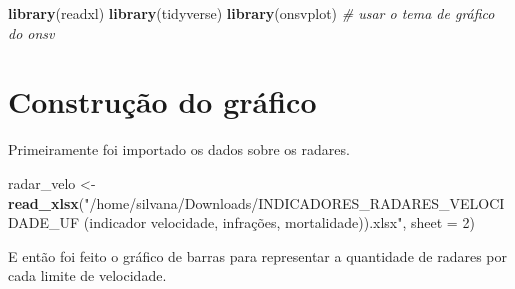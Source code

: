 \documentclass[
]{book}
\newenvironment{Shaded}{\begin{snugshade}}{\end{snugshade}}
\newcommand{\AttributeTok}[1]{\textcolor[rgb]{0.13,0.29,0.53}{#1}}
\newcommand{\CommentTok}[1]{\textcolor[rgb]{0.56,0.35,0.01}{\textit{#1}}}
\newcommand{\DecValTok}[1]{\textcolor[rgb]{0.00,0.00,0.81}{#1}}
\newcommand{\FunctionTok}[1]{\textcolor[rgb]{0.13,0.29,0.53}{\textbf{#1}}}
\newcommand{\NormalTok}[1]{#1}
\newcommand{\OtherTok}[1]{\textcolor[rgb]{0.56,0.35,0.01}{#1}}
\newcommand{\StringTok}[1]{\textcolor[rgb]{0.31,0.60,0.02}{#1}}
\begin{document}
\begin{Shaded}
\begin{Highlighting}[]
\FunctionTok{library}\NormalTok{(}\StringTok{\textquotesingle{}readxl\textquotesingle{}}\NormalTok{) }
\FunctionTok{library}\NormalTok{(}\StringTok{\textquotesingle{}tidyverse\textquotesingle{}}\NormalTok{)}
\FunctionTok{library}\NormalTok{(}\StringTok{\textquotesingle{}onsvplot\textquotesingle{}}\NormalTok{) }\CommentTok{\# usar o tema de gráfico do onsv}
\end{Highlighting}
\end{Shaded}

\section{Construção do gráfico}\label{construuxe7uxe3o-do-gruxe1fico}

Primeiramente foi importado os dados sobre os radares.

\begin{Shaded}
\begin{Highlighting}[]
\NormalTok{radar\_velo }\OtherTok{\textless{}{-}} \FunctionTok{read\_xlsx}\NormalTok{(}\StringTok{"/home/silvana/Downloads/INDICADORES\_RADARES\_VELOCIDADE\_UF (indicador velocidade, infrações, mortalidade)).xlsx"}\NormalTok{, }\AttributeTok{sheet =} \DecValTok{2}\NormalTok{)}
\end{Highlighting}
\end{Shaded}

E então foi feito o gráfico de barras para representar a quantidade de radares por cada limite de velocidade.
\end{document}

